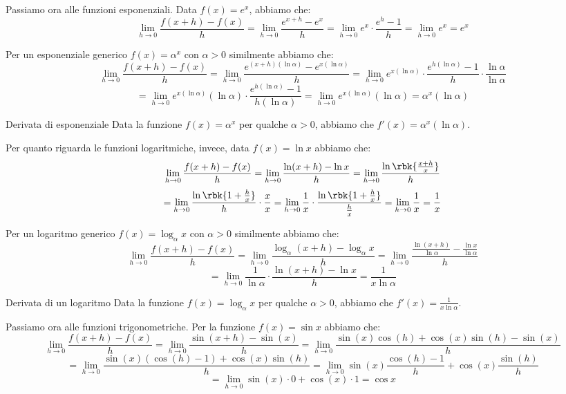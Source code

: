 \documentclass[a4paper, 12pt]{report}
\begin{document}
    Passiamo ora alle funzioni esponenziali. Data $f(x) = e^x$, abbiamo che:
    \[\lim_{h \to 0} \frac{f(x+h)-f(x)}{h} = \lim_{h \to 0} \frac{e^{x+h}-e^x}{h} = \lim_{h \to 0} e^{x} \cdot \frac{e^h - 1}{h} = \lim_{h \to 0} e^x = e^x\]

    Per un esponenziale generico $f(x) = \alpha^x$ con $\alpha > 0$ similmente abbiamo che:
    \[\lim_{h \to 0} \frac{f(x+h)-f(x)}{h} = \lim_{h \to 0} \frac{e^{(x+h)(\ln \alpha)}- e^{x(\ln \alpha)}}{h} = \lim_{h \to 0} e^{x(\ln \alpha)} \cdot \frac{e^{h(\ln \alpha)} - 1}{h} \cdot \frac{\ln \alpha}{\ln \alpha} \]
    \[= \lim_{h \to 0} e^{x(\ln \alpha)}(\ln \alpha) \cdot \frac{e^{h(\ln \alpha)} - 1}{h (\ln \alpha)} = \lim_{h \to 0} e^{x(\ln \alpha)}(\ln \alpha) = \alpha^x(\ln \alpha)\]

    \begin{framedprop}{Derivata di esponenziale}
        Data la funzione $f(x) = \alpha^x$ per qualche $\alpha > 0$, abbiamo che $f'(x) = \alpha^x (\ln \alpha)$.
    \end{framedprop}

    Per quanto riguarda le funzioni logaritmiche, invece, data $f(x) = \ln x$ abbiamo che:
    \[\lim_{h \to 0} \frac{f(x+h)-f(x)}{h} = \lim_{h \to 0} \frac{\ln(x+h)-\ln x}{h} = \lim_{h \to 0} \frac{\ln \rbk{\frac{x+h}{x}}}{h}\]
    \[= \lim_{h \to 0} \frac{\ln \rbk{1 + \frac{h}{x}}}{h} \cdot \frac{x}{x} = \lim_{h \to 0} \frac{1}{x} \cdot \frac{\ln \rbk{1 + \frac{h}{x}}}{\frac{h}{x}}= \lim_{h \to 0} \frac{1}{x}  = \frac{1}{x}\]

    Per un logaritmo generico $f(x) = \log_{\alpha} x$ con $\alpha > 0$ similmente abbiamo che:
    \[\lim_{h \to 0} \frac{f(x+h)-f(x)}{h} = \lim_{h \to 0} \frac{\log_{\alpha}(x+h)-\log_{\alpha} x}{h} = \lim_{h \to 0} \frac{\frac{\ln(x+h)}{\ln \alpha}- \frac{\ln x}{\ln \alpha}}{h} \]
    \[= \lim_{h \to 0} \frac{1}{\ln \alpha} \cdot \frac{\ln(x+h)-\ln x}{h} = \frac{1}{x \ln \alpha}\]

    \begin{framedprop}{Derivata di un logaritmo}
        Data la funzione $f(x) = \log_{\alpha} x$ per qualche $\alpha > 0$, abbiamo che $f'(x) = \frac{1}{x \ln \alpha}$.
    \end{framedprop}

    Passiamo ora alle funzioni trigonometriche. Per la funzione $f(x) = \sin x$ abbiamo che:
    \[\lim_{h \to 0} \frac{f(x+h)-f(x)}{h} = \lim_{h \to 0} \frac{\sin(x+h)-\sin(x)}{h} = \lim_{h \to 0} \frac{\sin(x) \cos(h) + \cos(x)\sin(h)-\sin(x)}{h}\]
    \[= \lim_{h \to 0} \frac{\sin(x) (\cos(h) - 1) + \cos(x)\sin(h)}{h} = \lim_{h \to 0} \sin(x) \frac{\cos(h) - 1}{h} + \cos(x)\frac{\sin(h)}{h} \]
    \[= \lim_{h \to 0} \sin(x) \cdot 0 + \cos (x) \cdot 1 = \cos x\]
\end{document}
